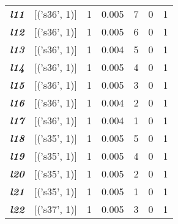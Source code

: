 \begin{table}
\begin{tabular}{llccccc}
    \textit{\textbf{l11}}                                            & {[}('s36', 1){]}    & 1             & 0.005               & 7              & 0              & 1           \\
    \textit{\textbf{l12}}                                            & {[}('s36', 1){]}    & 1             & 0.005               & 6              & 0              & 1           \\
    \textit{\textbf{l13}}                                            & {[}('s36', 1){]}    & 1             & 0.004               & 5              & 0              & 1           \\
    \textit{\textbf{l14}}                                            & {[}('s36', 1){]}    & 1             & 0.005               & 4              & 0              & 1           \\
    \textit{\textbf{l15}}                                            & {[}('s36', 1){]}    & 1             & 0.005               & 3              & 0              & 1           \\
    \textit{\textbf{l16}}                                            & {[}('s36', 1){]}    & 1             & 0.004               & 2              & 0              & 1           \\
    \textit{\textbf{l17}}                                            & {[}('s36', 1){]}    & 1             & 0.004               & 1              & 0              & 1           \\
    \textit{\textbf{l18}}                                            & {[}('s35', 1){]}    & 1             & 0.005               & 5              & 0              & 1           \\
    \textit{\textbf{l19}}                                            & {[}('s35', 1){]}    & 1             & 0.005               & 4              & 0              & 1           \\
    \textit{\textbf{l20}}                                            & {[}('s35', 1){]}    & 1             & 0.005               & 2              & 0              & 1           \\
    \textit{\textbf{l21}}                                            & {[}('s35', 1){]}    & 1             & 0.005               & 1              & 0              & 1           \\
    \textit{\textbf{l22}}                                            & {[}('s37', 1){]}    & 1             & 0.005               & 3              & 0              & 1           \\

\end{tabular}
\end{table}
